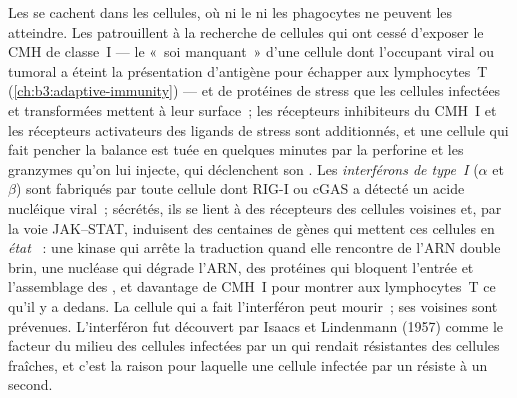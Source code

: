 \begin{definition}\label{def:b3:innate-immunity:nk-ifn}
Les  se cachent dans les cellules, où ni le  ni les
phagocytes ne peuvent les atteindre. Les \emph{} patrouillent à la recherche de cellules qui ont cessé
d'exposer le CMH de classe~I --- le «~soi manquant~» d'une cellule dont
l'occupant viral ou tumoral a éteint la présentation d'antigène pour
échapper aux lymphocytes~T (\cref{ch:b3:adaptive-immunity}) --- et de
protéines de stress que les cellules infectées et transformées mettent à
leur surface~; les récepteurs inhibiteurs du CMH~I et les récepteurs
activateurs des ligands de stress sont additionnés, et une cellule qui
fait pencher la balance est tuée en quelques minutes par la perforine et
les granzymes qu'on lui injecte, qui déclenchent son . Les
\emph{interférons de type~I} ($\alpha$ et $\beta$) sont fabriqués par
toute cellule dont RIG-I ou cGAS a détecté un acide nucléique viral~;
sécrétés, ils se lient à des récepteurs des cellules voisines et, par la
voie JAK--STAT, induisent des centaines de gènes qui mettent ces
cellules en \emph{état }~: une kinase qui arrête la traduction
quand elle rencontre de l'ARN double brin, une nucléase qui dégrade
l'ARN, des protéines qui bloquent l'entrée et l'assemblage des , et
davantage de CMH~I pour montrer aux lymphocytes~T ce qu'il y a dedans.
La cellule qui a fait l'interféron peut mourir~; ses voisines sont
prévenues. L'interféron fut découvert par Isaacs et Lindenmann (1957)
comme le facteur du milieu des cellules infectées par un  qui
rendait résistantes des cellules fraîches, et c'est la raison pour
laquelle une cellule infectée par un  résiste à un second.
\end{definition}

